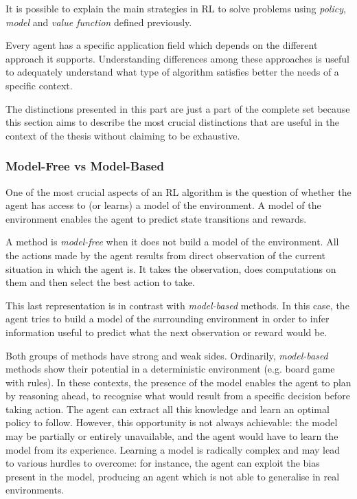 It is possible to explain the main strategies in RL to solve problems using \textit{policy}, \textit{model} and \textit{value function} defined previously.

Every agent has a specific application field which depends on the different approach it supports.
Understanding differences among these approaches is useful to adequately understand what type of algorithm satisfies better the needs of a specific context.

The distinctions presented in this part are just a part of the complete set because this section aims to describe the most crucial distinctions that are useful in the context of the thesis without claiming to be exhaustive.

\subsubsection{Model-Free vs Model-Based}

One of the most crucial aspects of an RL algorithm is the question of whether the agent has access to (or learns) a model of the environment. A model of the environment enables the agent to predict state transitions and rewards.

A method is \textit{model-free} when it does not build a model of the environment. All the actions made by the agent results from direct observation of the current situation in which the agent is. It takes the observation, does computations on them and then select the best action to take.

This last representation is in contrast with \textit{model-based} methods. In this case, the agent tries to build a model of the surrounding environment in order to infer information useful to predict what the next observation or reward would be.

Both groups of methods have strong and weak sides.
Ordinarily, \textit{model-based} methods show their potential in a deterministic environment (e.g. board game with rules). In these contexts, the presence of the model enables the agent to plan by reasoning ahead, to recognise what would result from a specific decision before taking action. The agent can extract all this knowledge and learn an optimal policy to follow. However, this opportunity is not always achievable: the model may be partially or entirely unavailable, and the agent would have to learn the model from its experience. Learning a model is radically complex and may lead to various hurdles to overcome: for instance, the agent can exploit the bias present in the model, producing an agent which is not able to generalise in real environments.


